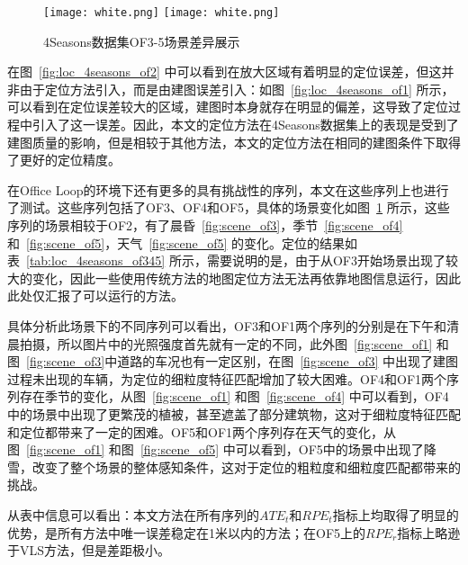\begin{figure}
  \centering
  \texttt{[image: white.png]}
  \texttt{[image: white.png]}
  \caption{4Seasons数据集OF3-5场景差异展示}
  \label{fig:scene_of}
\end{figure}

在图~\ref{fig:loc_4seasons_of2} 中可以看到在放大区域有着明显的定位误差，但这并非由于定位方法引入，而是由建图误差引入：如图~\ref{fig:loc_4seasons_of1} 所示，可以看到在定位误差较大的区域，建图时本身就存在明显的偏差，这导致了定位过程中引入了这一误差。因此，本文的定位方法在4Seasons数据集上的表现是受到了建图质量的影响，但是相较于其他方法，本文的定位方法在相同的建图条件下取得了更好的定位精度。

在Office Loop的环境下还有更多的具有挑战性的序列，本文在这些序列上也进行了测试。这些序列包括了OF3、OF4和OF5，具体的场景变化如图~\ref{fig:scene_of} 所示，这些序列的场景相较于OF2，有了晨昏~\ref{fig:scene_of3}，季节~\ref{fig:scene_of4}和~\ref{fig:scene_of5}，天气~\ref{fig:scene_of5} 的变化。定位的结果如表~\ref{tab:loc_4seasons_of345} 所示，需要说明的是，由于从OF3开始场景出现了较大的变化，因此一些使用传统方法的地图定位方法无法再依靠地图信息运行，因此此处仅汇报了可以运行的方法。

具体分析此场景下的不同序列可以看出，OF3和OF1两个序列的分别是在下午和清晨拍摄，所以图片中的光照强度首先就有一定的不同，此外图~\ref{fig:scene_of1} 和图~\ref{fig:scene_of3}中道路的车况也有一定区别，在图~\ref{fig:scene_of3} 中出现了建图过程未出现的车辆，为定位的细粒度特征匹配增加了较大困难。OF4和OF1两个序列存在季节的变化，从图~\ref{fig:scene_of1} 和图~\ref{fig:scene_of4} 中可以看到，OF4中的场景中出现了更繁茂的植被，甚至遮盖了部分建筑物，这对于细粒度特征匹配和定位都带来了一定的困难。OF5和OF1两个序列存在天气的变化，从图~\ref{fig:scene_of1} 和图~\ref{fig:scene_of5} 中可以看到，OF5中的场景中出现了降雪，改变了整个场景的整体感知条件，这对于定位的粗粒度和细粒度匹配都带来的挑战。

从表中信息可以看出：本文方法在所有序列的$ATE_t$和$RPE_t$指标上均取得了明显的优势，是所有方法中唯一误差稳定在1米以内的方法；在OF5上的$RPE_r$指标上略逊于VLS方法，但是差距极小。

